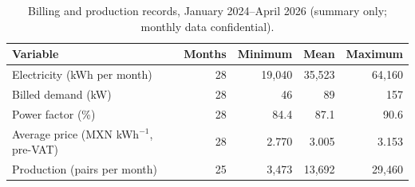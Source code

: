 \begin{table}[H]
\centering
\caption{Billing and production records, January 2024--April 2026 (summary only; monthly data confidential).}
\label{tab:billing}
\footnotesize
\begin{tabular}{lrrrr}
\toprule
Variable & Months & Minimum & Mean & Maximum \\
\midrule
Electricity (kWh per month) & 28 & 19{,}040 & 35{,}523 & 64{,}160 \\
Billed demand (kW) & 28 & 46 & 89 & 157 \\
Power factor (\%) & 28 & 84.4 & 87.1 & 90.6 \\
Average price (MXN kWh$^{-1}$, pre-VAT) & 28 & 2.770 & 3.005 & 3.153 \\
Production (pairs per month) & 25 & 3{,}473 & 13{,}692 & 29{,}460 \\
\bottomrule
\end{tabular}
\end{table}
